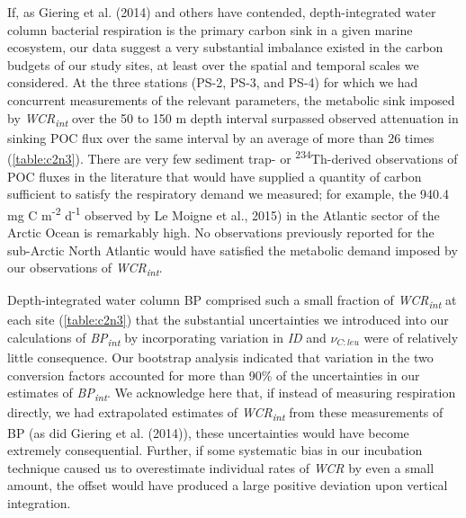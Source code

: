 If, as Giering et al. (2014) and others have contended, depth-integrated water column bacterial respiration is the primary carbon sink in a given marine ecosystem, our data suggest a very substantial imbalance existed in the carbon budgets of our study sites, at least over the spatial and temporal scales we considered. At the three stations (PS-2, PS-3, and PS-4) for which we had concurrent measurements of the relevant parameters, the metabolic sink imposed by \emph{WCR\textsubscript{int}} over the 50 to 150 m depth interval surpassed observed attenuation in sinking POC flux over the same interval by an average of more than 26 times (\autoref{table:c2n3}). There are very few sediment trap- or \textsuperscript{234}Th-derived observations of POC fluxes in the literature that would have supplied a quantity of carbon sufficient to satisfy the respiratory demand we measured; for example, the 940.4 mg C m\textsuperscript{-2} d\textsuperscript{-1} observed by Le Moigne et al., 2015) in the Atlantic sector of the Arctic Ocean is remarkably high. No observations previously reported for the sub-Arctic North Atlantic would have satisfied the metabolic demand imposed by our observations of \emph{WCR\textsubscript{int}}.

Depth-integrated water column BP comprised such a small fraction of \emph{WCR\textsubscript{int}} at each site (\autoref{table:c2n3}) that the substantial uncertainties we introduced into our calculations of \emph{BP\textsubscript{int}} by incorporating variation in \emph{ID} and $\nu _{C:leu}$ were of relatively little consequence. Our bootstrap analysis indicated that variation in the two conversion factors accounted for more than 90\% of the uncertainties in our estimates of \emph{BP\textsubscript{int}}. We acknowledge here that, if instead of measuring respiration directly, we had extrapolated estimates of \emph{WCR\textsubscript{int}} from these measurements of BP (as did Giering et al. (2014)), these uncertainties would have become extremely consequential. Further, if some systematic bias in our incubation technique caused us to overestimate individual rates of \emph{WCR} by even a small amount, the offset would have produced a large positive deviation upon vertical integration.

